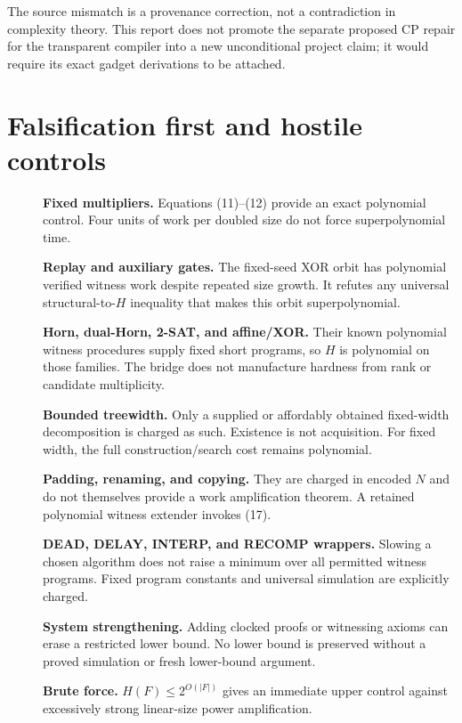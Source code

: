 \documentclass[11pt]{article}
\begin{document}
The source mismatch is a provenance correction, not a contradiction in
complexity theory. This report does not promote the separate proposed CP
repair for the transparent compiler into a new unconditional project
claim; it would require its exact gadget derivations to be attached.

\section*{Falsification first and hostile controls}
\begin{description}
\item[] \textbf{Fixed multipliers.} Equations (11)--(12) provide an exact
polynomial control. Four units of work per doubled size do not force
superpolynomial time.
\item[] \textbf{Replay and auxiliary gates.} The fixed-seed XOR orbit has
polynomial verified witness work despite repeated size growth.
It refutes any universal structural-to-$H$ inequality that makes this
orbit superpolynomial.
\item[] \textbf{Horn, dual-Horn, 2-SAT, and affine/XOR.}
Their known polynomial witness procedures supply fixed short programs,
so $H$ is polynomial on those families. The bridge does not manufacture
hardness from rank or candidate multiplicity.
\item[] \textbf{Bounded treewidth.} Only a supplied or affordably obtained
fixed-width decomposition is charged as such. Existence is not acquisition.
For fixed width, the full construction/search cost remains polynomial.
\item[] \textbf{Padding, renaming, and copying.}
They are charged in encoded $N$ and do not themselves provide a work
amplification theorem. A retained polynomial witness extender invokes (17).
\item[] \textbf{DEAD, DELAY, INTERP, and RECOMP wrappers.}
Slowing a chosen algorithm does not raise a minimum over all permitted
witness programs. Fixed program constants and universal simulation are
explicitly charged.
\item[] \textbf{System strengthening.} Adding clocked proofs or witnessing
axioms can erase a restricted lower bound. No lower bound is preserved
without a proved simulation or fresh lower-bound argument.
\item[] \textbf{Brute force.}
$H(F)\le2^{O(|F|)}$ gives an immediate upper control against excessively
strong linear-size power amplification.
\end{description}
\end{document}

